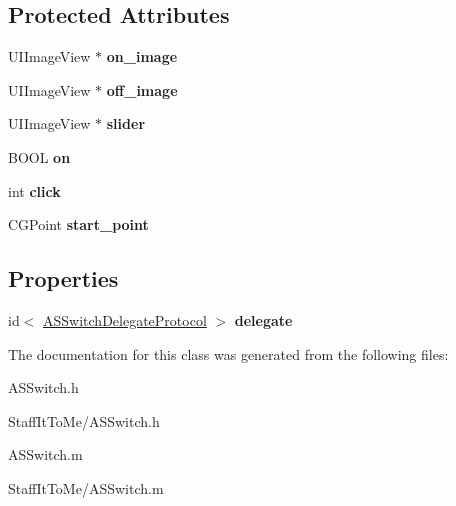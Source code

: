 \subsection*{\-Protected \-Attributes}
\begin{DoxyCompactItemize}
\item 
\hypertarget{interface_a_s_switch_a443bd99012bf0700b9e0d7d894c7a195}{
\-U\-I\-Image\-View $\ast$ {\bfseries on\-\_\-image}}
\label{interface_a_s_switch_a443bd99012bf0700b9e0d7d894c7a195}

\item 
\hypertarget{interface_a_s_switch_ad9a0b44dfc8d861f70caeb13989d2039}{
\-U\-I\-Image\-View $\ast$ {\bfseries off\-\_\-image}}
\label{interface_a_s_switch_ad9a0b44dfc8d861f70caeb13989d2039}

\item 
\hypertarget{interface_a_s_switch_ae3777c897b76b9529749eeac4aaa699b}{
\-U\-I\-Image\-View $\ast$ {\bfseries slider}}
\label{interface_a_s_switch_ae3777c897b76b9529749eeac4aaa699b}

\item 
\hypertarget{interface_a_s_switch_a44f55bb7ce08961c4214dc68d698ceb2}{
\-B\-O\-O\-L {\bfseries on}}
\label{interface_a_s_switch_a44f55bb7ce08961c4214dc68d698ceb2}

\item 
\hypertarget{interface_a_s_switch_a415a41d882dc920f39cf42debf1216aa}{
int {\bfseries click}}
\label{interface_a_s_switch_a415a41d882dc920f39cf42debf1216aa}

\item 
\hypertarget{interface_a_s_switch_a9ad5cb063ae22150b52da2bcd7336cd2}{
\-C\-G\-Point {\bfseries start\-\_\-point}}
\label{interface_a_s_switch_a9ad5cb063ae22150b52da2bcd7336cd2}

\end{DoxyCompactItemize}
\subsection*{\-Properties}
\begin{DoxyCompactItemize}
\item 
\hypertarget{interface_a_s_switch_ab8cec8b0afab9709fda8fc23df09354b}{
id$<$ \hyperlink{protocol_a_s_switch_delegate_protocol-p}{\-A\-S\-Switch\-Delegate\-Protocol} $>$ {\bfseries delegate}}
\label{interface_a_s_switch_ab8cec8b0afab9709fda8fc23df09354b}

\end{DoxyCompactItemize}


\-The documentation for this class was generated from the following files\-:\begin{DoxyCompactItemize}
\item 
\-A\-S\-Switch.\-h\item 
\-Staff\-It\-To\-Me/\-A\-S\-Switch.\-h\item 
\-A\-S\-Switch.\-m\item 
\-Staff\-It\-To\-Me/\-A\-S\-Switch.\-m\end{DoxyCompactItemize}
